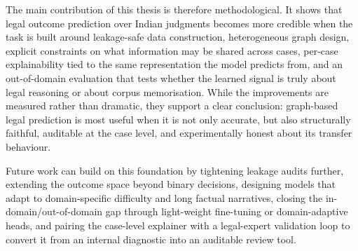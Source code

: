 The main contribution of this thesis is therefore methodological. It shows
that legal outcome prediction over Indian judgments becomes more credible
when the task is built around leakage-safe data construction, heterogeneous
graph design, explicit constraints on what information may be shared
across cases, per-case explainability tied to the same representation the
model predicts from, and an out-of-domain evaluation that tests whether
the learned signal is truly about legal reasoning or about corpus
memorisation. While the improvements are measured rather than dramatic, they
support a clear conclusion: graph-based legal prediction is most useful when
it is not only accurate, but also structurally faithful, auditable at the
case level, and experimentally honest about its transfer behaviour.

Future work can build on this foundation by tightening leakage audits
further, extending the outcome space beyond binary decisions, designing
models that adapt to domain-specific difficulty and long factual
narratives, closing the in-domain/out-of-domain gap through light-weight
fine-tuning or domain-adaptive heads, and pairing the case-level
explainer with a legal-expert validation loop to convert it from an
internal diagnostic into an auditable review tool.
